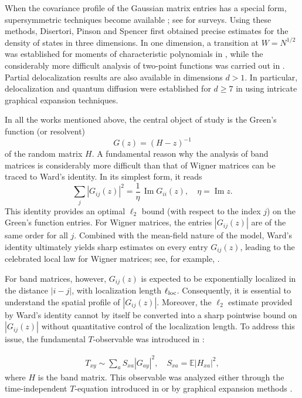 \documentclass[10pt,reqno]{article}
\DeclareMathOperator{\im}{{\mathrm{Im}}}
\def\Im{\im }
\theoremstyle{plain} %
\theoremstyle{remark}
\numberwithin{equation}{section}
\begin{document}
When the covariance profile of the Gaussian matrix entries has a special form, supersymmetric techniques become available
\cite{BaoErd2015,SchMT,Sch1,Sch2,Shcherbina:2021wz,DisPinSpe2002}; see
\cite{Efe1997,Spe} for surveys. Using these methods, Disertori, Pinson and Spencer \cite{DisPinSpe2002} first obtained precise estimates for the density of states in three dimensions. In one dimension, a transition at \(W=N^{1/2}\) was established for moments of characteristic polynomials in \cite{SchMT,Sch1}, while the considerably more difficult analysis of two-point functions was carried out in \cite{Shcherbina:2021wz}. Partial delocalization results are also available in dimensions \(d>1\). In particular, delocalization and quantum diffusion were established for \(d\ge7\) in
\cite{yang2021delocalization,yang2022delocalization,Xu:2024aa} using intricate graphical expansion techniques.


In all the works mentioned above, the central object of study is the Green's function (or resolvent)
\[
G(z)=(H-z)^{-1}
\]
of the random matrix \(H\). A fundamental reason why the analysis of band matrices is considerably more difficult than that of Wigner matrices can be traced to Ward's identity. In its simplest form, it reads
\[
 \sum_j | G_{ij}(z)|^2 = \frac{1}{\eta}\, \Im   G_{ii}(z),  \quad \eta=\Im z.
\]
This identity provides an optimal $\ell_2$ bound (with respect to the index \(j\)) on the Green's function entries. For Wigner matrices, the entries \( |G_{ij}(z)| \) are of the same order for all \(j\). Combined with the mean-field nature of the model, Ward's identity ultimately yields sharp estimates on every entry \(G_{ij}(z)\), leading to the celebrated local law for Wigner matrices; see, for example, \cite{erdHos2012rigidity}.

For band matrices, however, \(G_{ij}(z)\) is expected to be exponentially localized in the distance \(|i-j|\), with localization length \(\ell_{\rm loc}\). Consequently, it is essential to understand the spatial profile of \( |G_{ij}(z)| \). Moreover, the $\ell_2$ estimate provided by Ward's identity cannot by itself be converted into a sharp pointwise bound on \( |G_{ij}(z)| \) without quantitative control of the localization length. To address this issue,  the fundamental \(T\)-observable was introduced in \cite{erdos2013delocalization}:
 
\begin{align}\label{T}
T_{xy} \sim \sum_{a} S_{xa} |G_{ay}|^2 , \quad S_{xa} = \mathbb{E} |H_{xa}|^2,
\end{align}
where \(H\) is the band matrix. This observable was analyzed either through the time-independent \(T\)-equation introduced in \cite{erdos2013delocalization} or by graphical expansion methods \cite{yang2021delocalization, yang2022delocalization, Xu:2024aa}.
\end{document}
